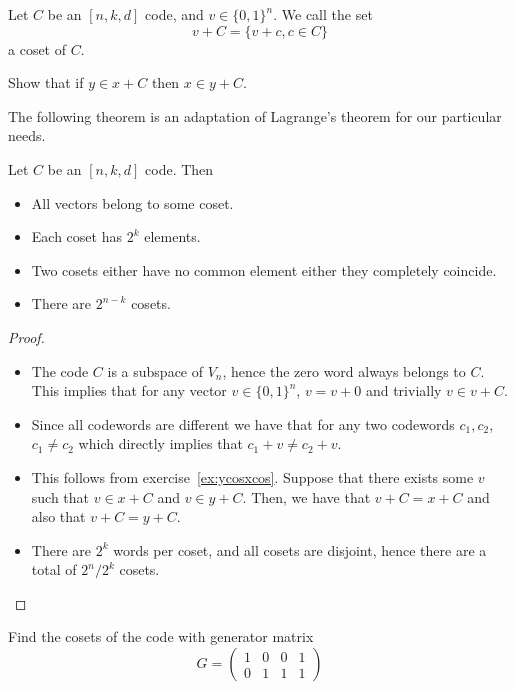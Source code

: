 \begin{definition}
Let $C$ be an $[n,k,d]$ code, and $v\in\{0,1\}^n$. We call the set 
\begin{equation}
v+C=\{v+c,c\in C\}
\end{equation}
a coset of $C$.
\end{definition}
\begin{exercise}
\label{ex:ycosxcos}
Show that if $y\in x+C$ then $x\in y+C$.
\end{exercise}
The following theorem is an adaptation of Lagrange's theorem for our particular needs. %
\begin{theorem}
Let $C$ be an $[n,k,d]$ code. Then
\begin{itemize}
\item All vectors belong to some coset.
\item Each coset has $2^k$ elements.
\item Two cosets either have no common element either they completely coincide.
\item There are $2^{n-k}$ cosets.
\end{itemize}
\end{theorem}
\begin{proof}

\

\begin{itemize}
\item The code $C$ is a subspace of $V_n$, hence the zero word always belongs to $C$. This implies that for any vector $v\in\{0,1\}^n$, $v=v+0$ and trivially $v\in v+C$.
\item Since all codewords are different we have that for any two codewords $c_1,c_2$, $c_1\neq c_2$ which directly implies that $c_1+v\neq c_2+v$.
\item This follows from exercise~\ref{ex:ycosxcos}. Suppose that there exists some $v$ such that $v\in x+C$ and $v\in y+C$. Then, we have that $v+C=x+C$ and also that $v+C=y+C$.
\item There are $2^k$ words per coset, and all cosets are disjoint, hence there are a total of $2^n/2^k$ cosets.
\end{itemize}
\end{proof}
\begin{exercise}
\label{ex:cosets}
Find the cosets of the code with generator matrix
\begin{equation}
G=\begin{pmatrix}1&0&0&1\\0&1&1&1\end{pmatrix}
\end{equation}
\end{exercise}
